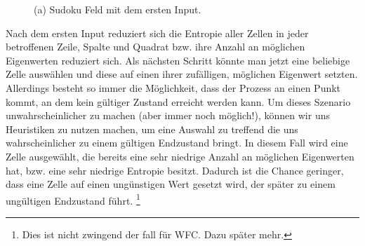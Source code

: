 \documentclass[12pt, a4paper,twoside,openright]{report} %
\begin{document}
\begin{figure}[H]
    \centering
    \caption{(a) Sudoku Feld mit dem ersten Input.}%
\end{figure}

Nach dem ersten Input reduziert sich die Entropie aller Zellen in jeder betroffenen Zeile,
Spalte und Quadrat bzw. ihre Anzahl an möglichen Eigenwerten reduziert sich.
Als nächsten Schritt könnte man jetzt eine beliebige Zelle auswählen und diese auf einen ihrer zufälligen, möglichen Eigenwert setzten.
Allerdings besteht so immer die Möglichkeit, dass der Prozess an einen Punkt kommt, an dem kein gültiger Zustand erreicht werden kann.
Um dieses Szenario unwahrscheinlicher zu machen {(aber immer noch möglich!)}, können wir uns Heuristiken zu nutzen machen,
um eine Auswahl zu treffend die uns wahrscheinlicher zu einem gültigen Endzustand bringt.
In diesem Fall wird eine Zelle ausgewählt, die bereits eine sehr niedrige Anzahl an möglichen Eigenwerten hat, bzw. eine sehr niedrige Entropie besitzt.
Dadurch ist die Chance geringer, dass eine Zelle auf einen ungünstigen Wert gesetzt wird, der später zu einem ungültigen Endzustand führt.
\footnote[2]{Dies ist nicht zwingend der fall für WFC. Dazu später mehr.}
\end{document}
